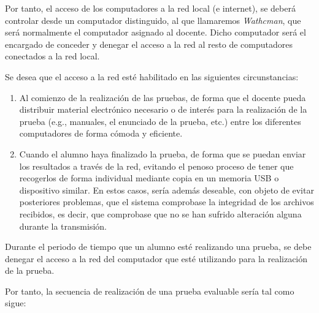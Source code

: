 Por tanto, el acceso de los computadores a la red local (e internet), se deberá controlar desde un computador distinguido, al que llamaremos \emph{Wathcman},
que será normalmente el computador asignado al docente. Dicho computador será el encargado de conceder y denegar el acceso a la red al resto de computadores conectados a la red local.

Se desea que el acceso a la red esté habilitado en las siguientes circunstancias:

\begin{enumerate}
	\item Al comienzo de la realización de las pruebas, de forma que el docente pueda distribuir material electrónico necesario o de interés para la realización de la prueba (e.g., manuales, el enunciado de la prueba, etc.) entre los diferentes computadores de forma cómoda y eficiente.
	\item Cuando el alumno haya finalizado la prueba, de forma que se puedan enviar los resultados a través de la red, evitando el penoso proceso de tener que recogerlos de forma individual mediante copia en un memoria USB o dispositivo similar. En estos casos, sería además deseable, con objeto de evitar posteriores problemas, que el sistema comprobase la integridad de los archivos recibidos, es decir, que comprobase que no se han sufrido alteración alguna durante la transmisión.
\end{enumerate}

Durante el periodo de tiempo que un alumno esté realizando una prueba, se debe denegar el acceso a la red del computador que esté utilizando para la realización de la prueba.

Por tanto, la secuencia de realización de una prueba evaluable sería tal como sigue:

